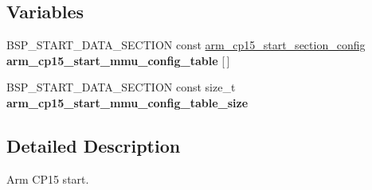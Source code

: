 \subsection*{Variables}
\begin{DoxyCompactItemize}
\item 
\mbox{\label{arm-cp15-start_8h_a91adb3402e00e852a85571ea9eb1f0a3}} 
B\+S\+P\+\_\+\+S\+T\+A\+R\+T\+\_\+\+D\+A\+T\+A\+\_\+\+S\+E\+C\+T\+I\+ON const \mbox{\hyperlink{structarm__cp15__start__section__config}{arm\+\_\+cp15\+\_\+start\+\_\+section\+\_\+config}} {\bfseries arm\+\_\+cp15\+\_\+start\+\_\+mmu\+\_\+config\+\_\+table} \mbox{[}$\,$\mbox{]}
\item 
\mbox{\label{arm-cp15-start_8h_ad2b78b68100ac150ca0afc24dd41957b}} 
B\+S\+P\+\_\+\+S\+T\+A\+R\+T\+\_\+\+D\+A\+T\+A\+\_\+\+S\+E\+C\+T\+I\+ON const size\+\_\+t {\bfseries arm\+\_\+cp15\+\_\+start\+\_\+mmu\+\_\+config\+\_\+table\+\_\+size}
\end{DoxyCompactItemize}


\subsection{Detailed Description}
Arm C\+P15 start. 

